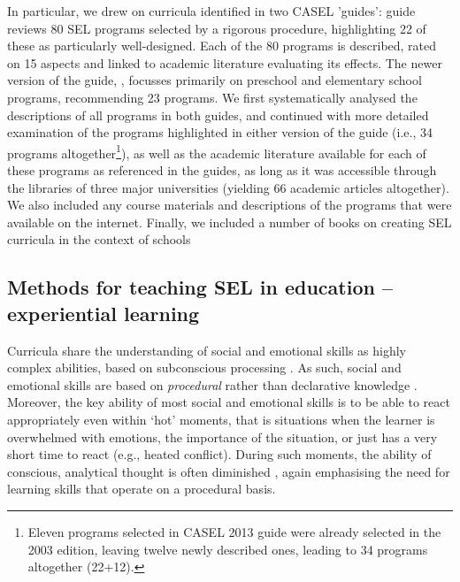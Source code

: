 \documentclass[prodmode,acmtochi]{acmsmall}
\newcommand{\GeraldineTODO}[1]{}
\begin{document}
In particular, we drew on curricula identified in two CASEL 'guides':  guide reviews 80 SEL programs selected by a rigorous procedure, highlighting 22 of
 these as particularly well-designed. Each of the 80 programs is described, rated on 15 aspects and linked to academic literature evaluating its effects. The newer version of the guide, , focusses primarily on preschool and elementary school programs, recommending 23 programs.
%
We first systematically analysed the descriptions of all programs in both guides, and continued with more detailed examination of the programs highlighted in either version of the guide (i.e., 34 programs altogether\footnote{Eleven programs selected in CASEL 2013 guide were already selected in the 2003 edition, leaving twelve newly described ones, leading to 34 programs altogether (22+12). \GeraldineTODO{LIST\ THESE\ BY\ NAME\ HERE\ AS\ COMPLETE\ LIST?}}), as well as the academic literature available for each of these programs as referenced in the guides, as long as it was accessible through the libraries of three major universities (yielding 66 academic articles altogether). We also included any course materials and descriptions of the programs that were available on the internet. Finally, we included a number of books on creating SEL curricula in the context of schools \cite{Maree2007,Elias1997,Pasi,Zins2004} 








\subsection{Methods for teaching SEL in education -- experiential learning}
\label{sec:methods}

Curricula share the understanding of social and emotional skills as highly complex abilities, based on subconscious processing \cite{Ambady2010,Lieberman2000}. As such, social and emotional skills are based on \emph{procedural} rather than declarative knowledge \cite[p.288]{kruglanski2007social}. Moreover, the key ability of most social and emotional skills is to be able to react appropriately even within `hot' moments, that is situations  when the learner is overwhelmed with emotions, the importance of the situation, or just has a very short time to react (e.g., heated conflict). During such moments, the ability of conscious, analytical thought is often diminished \cite{Wyman2010,leDoux1998}, again emphasising the need for learning skills that operate on a procedural basis.
\end{document}
